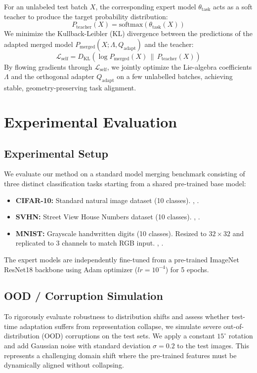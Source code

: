 \documentclass{article}
\theoremstyle{plain}
\theoremstyle{definition}
\theoremstyle{remark}
\begin{document}
For an unlabeled test batch $X$, the corresponding expert model $\theta_{\text{task}}$ acts as a soft teacher to produce the target probability distribution:
\begin{equation}
P_{\text{teacher}}(X) = \text{softmax}(\theta_{\text{task}}(X))
\end{equation}
We minimize the Kullback-Leibler (KL) divergence between the predictions of the adapted merged model $P_{\text{merged}}(X; \Lambda, Q_{\text{adapt}})$ and the teacher:
\begin{equation}
\mathcal{L}_{\text{self}} = D_{\text{KL}}\left( \log P_{\text{merged}}(X) \,\|\, P_{\text{teacher}}(X) \right)
\end{equation}
By flowing gradients through $\mathcal{L}_{\text{self}}$, we jointly optimize the Lie-algebra coefficients $\Lambda$ and the orthogonal adapter $Q_{\text{adapt}}$ on a few unlabelled batches, achieving stable, geometry-preserving task alignment.

\section{Experimental Evaluation}
\label{submission-experiments}

\subsection{Experimental Setup}
We evaluate our method on a standard model merging benchmark consisting of three distinct classification tasks starting from a shared pre-trained base model:
\begin{itemize}
    \item \textbf{CIFAR-10:} Standard natural image dataset (10 classes).
    , .
    \item \textbf{SVHN:} Street View House Numbers dataset (10 classes).
    , .
    \item \textbf{MNIST:} Grayscale handwritten digits (10 classes). Resized to $32 \times 32$ and replicated to 3 channels to match RGB input.
    , .
\end{itemize}
The expert models are independently fine-tuned from a pre-trained ImageNet ResNet18 backbone using Adam optimizer ($lr=10^{-4}$) for 5 epochs. 

\subsection{OOD / Corruption Simulation}
To rigorously evaluate robustness to distribution shifts and assess whether test-time adaptation suffers from representation collapse, we simulate severe out-of-distribution (OOD) corruptions on the test sets. We apply a constant $15^\circ$ rotation and add Gaussian noise with standard deviation $\sigma = 0.2$ to the test images. This represents a challenging domain shift where the pre-trained features must be dynamically aligned without collapsing.
\end{document}
